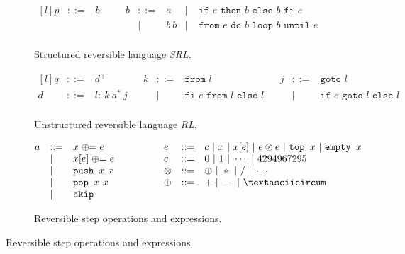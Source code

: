 \begin{figure}[]

  \begin{subfigure}{\textwidth}
    \center
    $$\begin{matrix*}[l]
      {p} & ::= & {b} & \quad & {b} & ::= & a             & | & \texttt{ if }e\texttt{ then }b\texttt{ else }b\texttt{ fi }e\\
                 &     &           &        &            &  |  & b\ b & | & \texttt{ from }e\texttt{ do }b\texttt{ loop }b\texttt{ until }e\\
    \end{matrix*}$$
    \caption{Structured reversible language \textit{SRL}.}
    \label{fig:srlspec}
  \end{subfigure}

  \begin{subfigure}{\textwidth}
    \center
    $$\begin{matrix*}[l]
      {q} & ::= & {d}^+                                      & & {k} & ::= & \texttt{from }l & & {j} & ::= & \texttt{goto }l\\
      {d} & ::= & {l}:\ {k}\ {a}^*\ {j} &       &            &  |  & \texttt{fi }e\texttt{ from }l\texttt{ else }l &
        & & | & \texttt{if }e\texttt{ goto }l\texttt{ else }l\\
    \end{matrix*}$$
    \caption{Unstructured reversible language \textit{RL}.}
    \label{fig:rlspec}
  \end{subfigure}

  \begin{subfigure}{\textwidth}
    \center
    $$\begin{matrix*}[l]
      {a} & ::= & {x}\mathrel{\oplus}= e & \quad\quad\quad &  e & ::= & {c} \ | \ {x} \ | \ {x}[ e] \ | \  e\otimes e \ | \ \texttt{top }{x} \ | \ \texttt{empty }{x}\\
                 &  |  & {x}[ e]\mathrel{\oplus}= e &     & {c} & ::= & 0\ | \ 1\ |\ \cdots\ |\ 4294967295\\
                 &  |  & \texttt{push }{x}\ {x}      &     & \otimes    & ::= & \oplus \ | \ * \ | \ / \ | \ \cdots\\
                 &  |  & \texttt{pop  }{x}\ {x}      &     & \oplus     & ::= & +  \ | \  -  \ | \  \textasciicircum\\
                 &  |  & \texttt{skip}\\
    \end{matrix*}$$
    \caption{Reversible step operations and expressions.}
  \end{subfigure}


\end{figure}
